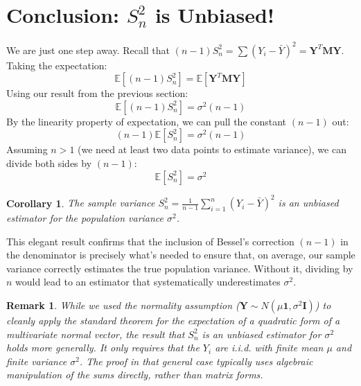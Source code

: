 \documentclass[11pt]{article}
\newcommand{\E}{\mathbb{E}} %
\newcommand{\bY}{\bm{Y}} %
\newcommand{\bM}{\mathbf{M}} %
\newcommand{\bI}{\mathbf{I}} %
\newcommand{\bone}{\mathbf{1}} %
\newtheorem{corollary}{Corollary}
\newtheorem{remark}{Remark}
\begin{document}
\section{Conclusion: \texorpdfstring{$S_n^2$}{Sn2} is Unbiased!}

We are just one step away. Recall that $(n-1)S_n^2 = \sum (Y_i - \bar{Y})^2 = \bY^T \bM \bY$. Taking the expectation:
\[ \E[(n-1)S_n^2] = \E[\bY^T \bM \bY] \]
Using our result from the previous section:
\[ \E[(n-1)S_n^2] = \sigma^2 (n-1) \]
By the linearity property of expectation, we can pull the constant $(n-1)$ out:
\[ (n-1)\E[S_n^2] = \sigma^2 (n-1) \]
Assuming $n > 1$ (we need at least two data points to estimate variance), we can divide both sides by $(n-1)$:
\[ \boxed{\E[S_n^2] = \sigma^2} \]

\begin{corollary}
The sample variance $S_n^2 = \frac{1}{n-1} \sum_{i=1}^n (Y_i - \bar{Y})^2$ is an unbiased estimator for the population variance $\sigma^2$.
\end{corollary}

This elegant result confirms that the inclusion of Bessel's correction $(n-1)$ in the denominator is precisely what's needed to ensure that, on average, our sample variance correctly estimates the true population variance. Without it, dividing by $n$ would lead to an estimator that systematically underestimates $\sigma^2$.

\begin{remark}
While we used the normality assumption ($\bY \sim N(\mu\bone, \sigma^2\bI)$) to cleanly apply the standard theorem for the expectation of a quadratic form of a multivariate normal vector, the result that $S_n^2$ is an unbiased estimator for $\sigma^2$ holds more generally. It only requires that the $Y_i$ are i.i.d. with finite mean $\mu$ and finite variance $\sigma^2$. The proof in that general case typically uses algebraic manipulation of the sums directly, rather than matrix forms.
\end{remark}
\end{document}
